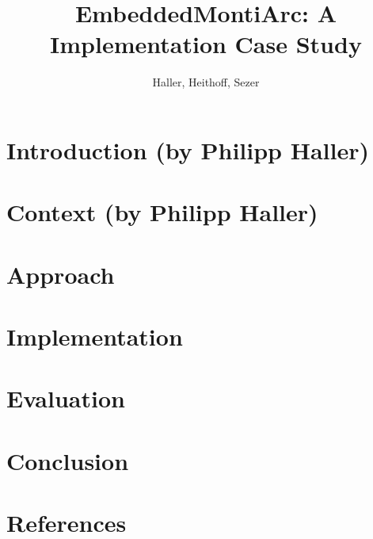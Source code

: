\documentclass{elsarticle}
\begin{document}
\begin{frontmatter}

\title{EmbeddedMontiArc: A Implementation Case Study}
\tnotetext[mytitlenote]{}

\author{Haller, Heithoff, Sezer}
\address{RWTH Aachen}



\begin{abstract}

\end{abstract}

\begin{keyword}

\end{keyword}

\end{frontmatter}

\linenumbers


\newpage
\section{Introduction (by Philipp Haller)}
\label{sec:intro}


\newpage
\section{Context (by Philipp Haller)}
\label{sec:context}


\newpage
\section{Approach}
\label{sec:approach}


\newpage
\section{Implementation}
\label{sec:implementation}


\newpage
\section{Evaluation}
\label{sec:evaluation}


\newpage
\section{Conclusion}
\label{sec:conclusion}



\newpage
\section*{References}

\end{document}
